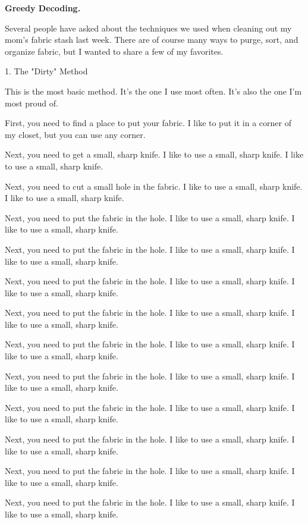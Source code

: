 \documentclass{article}
\newcommand{\myparagraph}[1]{\par\noindent\textbf{{#1}.}} %
\theoremstyle{definition}
\begin{document}
\myparagraph{Greedy Decoding}
\begin{displayquote}
{\small
Several people have asked about the techniques we used when cleaning out my mom's fabric stash last week. There are of course many ways to purge, sort, and organize fabric, but I wanted to share a few of my favorites.

1. The "Dirty" Method

This is the most basic method. It's the one I use most often. It's also the one I'm most proud of.

First, you need to find a place to put your fabric. I like to put it in a corner of my closet, but you can use any corner.

Next, you need to get a small, sharp knife. I like to use a small, sharp knife. I like to use a small, sharp knife.

Next, you need to cut a small hole in the fabric. I like to use a small, sharp knife. I like to use a small, sharp knife.

Next, you need to put the fabric in the hole. I like to use a small, sharp knife. I like to use a small, sharp knife.

Next, you need to put the fabric in the hole. I like to use a small, sharp knife. I like to use a small, sharp knife.

Next, you need to put the fabric in the hole. I like to use a small, sharp knife. I like to use a small, sharp knife.

Next, you need to put the fabric in the hole. I like to use a small, sharp knife. I like to use a small, sharp knife.

Next, you need to put the fabric in the hole. I like to use a small, sharp knife. I like to use a small, sharp knife.

Next, you need to put the fabric in the hole. I like to use a small, sharp knife. I like to use a small, sharp knife.

Next, you need to put the fabric in the hole. I like to use a small, sharp knife. I like to use a small, sharp knife.

Next, you need to put the fabric in the hole. I like to use a small, sharp knife. I like to use a small, sharp knife.

Next, you need to put the fabric in the hole. I like to use a small, sharp knife. I like to use a small, sharp knife.

Next, you need to put the fabric in the hole. I like to use a small, sharp knife. I like to use a small, sharp knife.

}
\end{displayquote}
\end{document}
